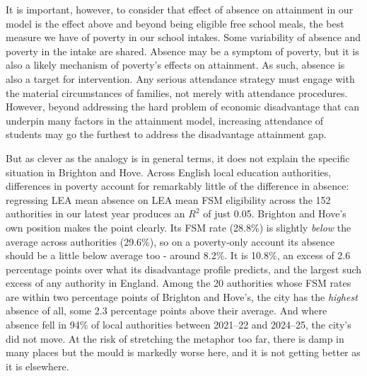 \documentclass[
  12pt,
  titlepage]{article}
\begin{document}
It is important, however, to consider that effect of absence on
attainment in our model is the effect above and beyond being eligible
free school meals, the best measure we have of poverty in our school
intakes. Some variability of absence and poverty in the intake are
shared. Absence may be a symptom of poverty, but it is also a likely
mechanism of poverty's effects on attainment. As such, absence is also a
target for intervention. Any serious attendance strategy must engage
with the material circumstances of families, not merely with attendance
procedures. However, beyond addressing the hard problem of economic
disadvantage that can underpin many factors in the attainment model,
increasing attendance of students may go the furthest to address the
disadvantage attainment gap.

But as clever as the analogy is in general terms, it does not explain
the specific situation in Brighton and Hove. Across English local
education authorities, differences in poverty account for remarkably
little of the difference in absence: regressing LEA mean absence on LEA
mean FSM eligibility across the 152 authorities in our latest year
produces an \(R^2\) of just 0.05. Brighton and Hove's own position makes
the point clearly. Its FSM rate (28.8\%) is slightly \emph{below} the
average across authorities (29.6\%), so on a poverty-only account its
absence should be a little below average too - around 8.2\%. It is
10.8\%, an excess of 2.6 percentage points over what its disadvantage
profile predicts, and the largest such excess of any authority in
England. Among the 20 authorities whose FSM rates are within two
percentage points of Brighton and Hove's, the city has the
\emph{highest} absence of all, some 2.3 percentage points above their
average. And where absence fell in 94\% of local authorities between
2021--22 and 2024--25, the city's did not move. At the risk of
stretching the metaphor too far, there is damp in many places but the
mould is markedly worse here, and it is not getting better as it is
elsewhere.
\end{document}
